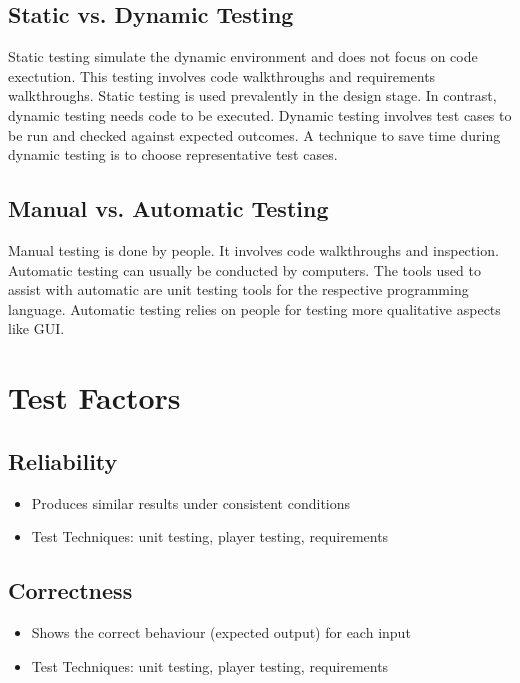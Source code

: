 \documentclass[12pt]{article}
\begin{document}
\subsection{Static vs. Dynamic Testing}
Static testing simulate the dynamic environment and does not focus on code exectution. This testing involves code walkthroughs and requirements walkthroughs. Static testing is used prevalently in the design stage. In contrast, dynamic testing needs code to be executed. \newline\newline
Dynamic testing involves test cases to be run and checked against expected outcomes. A technique to save time during dynamic testing is to choose representative test cases. 
\subsection{Manual vs. Automatic Testing}
Manual testing is done by people. It involves code walkthroughs and inspection. \newline\newline
Automatic testing can usually be conducted by computers. The tools used to assist with automatic are unit testing tools for the respective programming language. Automatic testing relies on people for testing more qualitative aspects like GUI. 

\section{Test Factors}

\subsection{Reliability}
\begin{itemize}
\item Produces similar results under consistent conditions
\item Test Techniques: unit testing, player testing, requirements
\end{itemize}

\subsection{Correctness}
\begin{itemize}
\item Shows the correct behaviour (expected output) for each input
\item Test Techniques: unit testing, player testing, requirements
\end{itemize}
\end{document}
